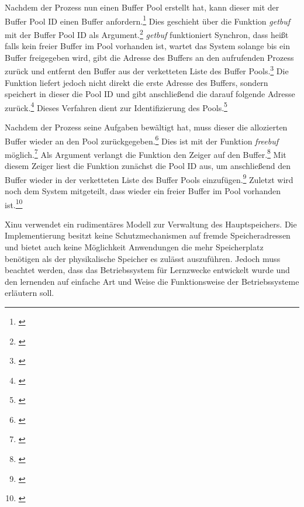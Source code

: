 

Nachdem der Prozess nun einen Buffer Pool erstellt hat, kann dieser mit der Buffer Pool ID einen Buffer anfordern.\footnote{\cite[S.~178]{Comer.2015}} Dies geschieht über die Funktion \textit{getbuf} mit der Buffer Pool ID als Argument.\footnote{\cite[S.~178]{Comer.2015}} \textit{getbuf} funktioniert Synchron, dass heißt falls kein freier Buffer im Pool vorhanden ist, wartet das System solange bis ein Buffer freigegeben wird, gibt die Adresse des Buffers an den aufrufenden Prozess zurück und entfernt den Buffer aus der verketteten Liste des Buffer Pools.\footnote{\cite[S.~178]{Comer.2015}}  Die Funktion liefert jedoch nicht direkt die erste Adresse des Buffers, sondern speichert in dieser die Pool ID und gibt anschließend die darauf folgende Adresse zurück.\footnote{\cite[S.~179]{Comer.2015}} Dieses Verfahren dient zur Identifizierung des Pools.\footnote{\cite[S.~179]{Comer.2015}}



Nachdem der Prozess seine Aufgaben bewältigt hat, muss dieser die allozierten Buffer wieder an den Pool zurückgegeben.\footnote{\cite[S.~179]{Comer.2015}} Dies ist mit der Funktion \textit{freebuf} möglich.\footnote{\cite[S.~179]{Comer.2015}} Als Argument verlangt die Funktion den Zeiger auf den Buffer.\footnote{\cite[S.~179]{Comer.2015}} Mit diesem Zeiger liest die Funktion zunächst die Pool ID aus, um anschließend den Buffer wieder in der verketteten Liste des Buffer Pools einzufügen.\footnote{\cite[S.~180]{Comer.2015}} Zuletzt wird noch dem System mitgeteilt, dass wieder ein freier Buffer im Pool vorhanden ist.\footnote{\cite[S.~180]{Comer.2015}}



Xinu verwendet ein rudimentäres Modell zur Verwaltung des Hauptspeichers. Die Implementierung besitzt keine Schutzmechanismen auf fremde Speicheradressen und bietet auch keine Möglichkeit Anwendungen die mehr Speicherplatz benötigen als der physikalische Speicher es zulässt auszuführen. Jedoch muss beachtet werden, dass das Betriebssystem für Lernzwecke entwickelt wurde und den lernenden auf einfache Art und Weise die Funktionsweise der Betriebssysteme erläutern soll.

